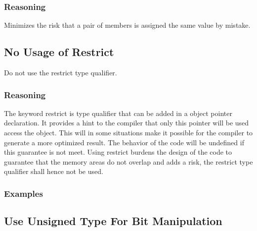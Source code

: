 \documentclass{article}
\begin{document}
\subsubsection{Reasoning}

Minimizes the risk that a pair of members is assigned the same value by mistake.
\begin{minipage}[t]{0.47\linewidth}

\end{minipage}
\hfill
\begin{minipage}[t]{0.47\linewidth}

\end{minipage}

\subsection{No Usage of Restrict}

Do not use the restrict type qualifier.

\subsubsection{Reasoning}

The keyword restrict is type qualifier that can be added in a object pointer declaration. It provides a hint to the compiler that only this pointer will be used access the object. This will in some situations make it possible for the compiler to generate a more optimized result. The behavior of the code will be undefined if this guarantee is not meet. Using restrict burdens the design of the code to guarantee that the memory areas do not overlap and adds a risk, the restrict type qualifier shall hence not be used.

\subsubsection{Examples}

\begin{minipage}[t]{0.47\linewidth}

\end{minipage}
\hfill
\begin{minipage}[t]{0.47\linewidth}

\end{minipage}

\subsection{Use Unsigned Type For Bit Manipulation}
\end{document}

